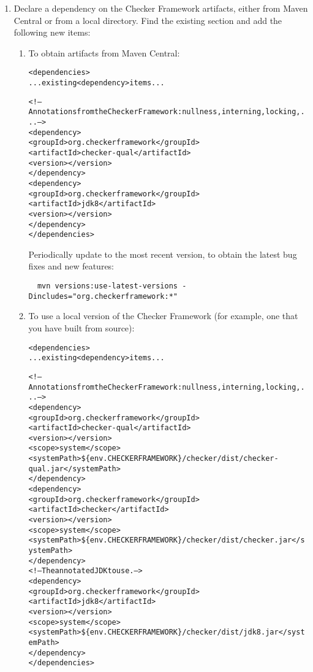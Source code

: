 \begin{enumerate}

\item Declare a dependency on the Checker Framework artifacts, either from
  Maven Central or from a local directory.  Find the
  existing  section and add the following new
   items:

\begin{enumerate}
\item
  To obtain artifacts from Maven Central:

\begin{alltt}
  <dependencies>
    ... existing <dependency> items ...

    <!-- Annotations from the Checker Framework: nullness, interning, locking, ... -->
    <dependency>
      <groupId>org.checkerframework</groupId>
      <artifactId>checker-qual</artifactId>
      <version>\ReleaseVersion{}</version>
    </dependency>
    <dependency>
      <groupId>org.checkerframework</groupId>
      <artifactId>jdk8</artifactId>
      <version>\ReleaseVersion{}</version>
    </dependency>
  </dependencies>
\end{alltt}

Periodically update to the most recent version, to obtain the
latest bug fixes and new features:
\begin{Verbatim}
  mvn versions:use-latest-versions -Dincludes="org.checkerframework:*"
\end{Verbatim}

\item
  To use a local version of the Checker Framework (for example,
  one that you have built from source):

\begin{alltt}
  <dependencies>
    ... existing <dependency> items ...

    <!-- Annotations from the Checker Framework: nullness, interning, locking, ... -->
    <dependency>
      <groupId>org.checkerframework</groupId>
      <artifactId>checker-qual</artifactId>
      <version>\ReleaseVersion{}</version>
      <scope>system</scope>
      <systemPath>\$\{env.CHECKERFRAMEWORK\}/checker/dist/checker-qual.jar</systemPath>
    </dependency>
    <dependency>
      <groupId>org.checkerframework</groupId>
      <artifactId>checker</artifactId>
      <version>\ReleaseVersion{}</version>
      <scope>system</scope>
      <systemPath>\$\{env.CHECKERFRAMEWORK\}/checker/dist/checker.jar</systemPath>
    </dependency>
    <!-- The annotated JDK to use. -->
    <dependency>
      <groupId>org.checkerframework</groupId>
      <artifactId>jdk8</artifactId>
      <version>\ReleaseVersion{}</version>
      <scope>system</scope>
      <systemPath>\$\{env.CHECKERFRAMEWORK\}/checker/dist/jdk8.jar</systemPath>
    </dependency>
  </dependencies>
\end{alltt}


\end{enumerate}
\end{enumerate}
